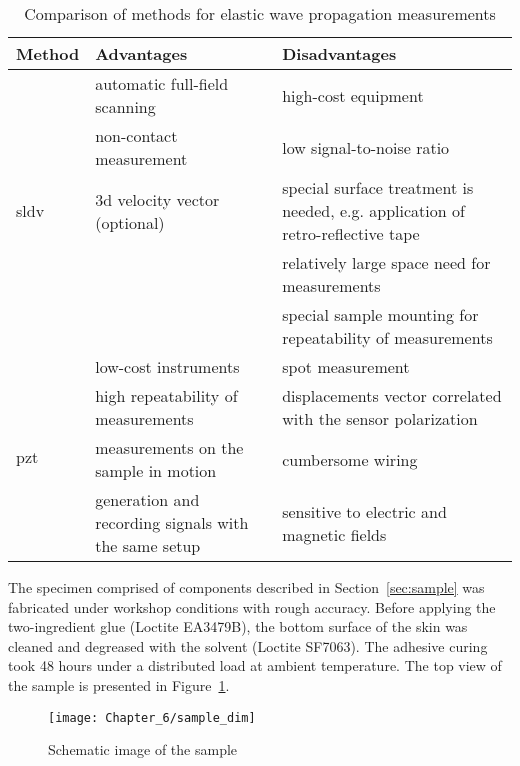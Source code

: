 \begin{table}[!htb]
	\small
	\tabcolsep=0.2cm
	\caption{\label{tab:method_comp}Comparison of methods for elastic wave propagation measurements}
	\begin{tabular}{p{}>{\raggedright}p{}>{\raggedright \arraybackslash}p{}}
		\toprule
		\textbf{Method} &\textbf{Advantages} & \textbf{Disadvantages}\\
		\midrule
		\multirow{5}{*}{\ac{sldv}}   & \tabitem automatic full-field scanning & \tabitem high-cost equipment\\ 
		& \tabitem non-contact measurement & \tabitem low signal-to-noise ratio\\
		& \tabitem \ac{3d} velocity vector (optional)& \tabitem special surface treatment is needed, e.g. application of retro-reflective tape\\
		& & \tabitem relatively large space need for measurements \\
		& & \tabitem special sample mounting for repeatability of measurements\\
		\midrule
		\multirow{5}{*}{\ac{pzt}} & \tabitem low-cost instruments & \tabitem spot measurement\\
		& \tabitem high repeatability of measurements & \tabitem displacements vector correlated with the sensor polarization\\
		& \tabitem measurements on the sample in motion & \tabitem cumbersome wiring\\
		& \tabitem generation and recording signals with the same setup & \tabitem sensitive to electric and magnetic fields\\		
		\bottomrule
	\end{tabular}
\end{table}

The specimen comprised of components described in Section~\ref{sec:sample} was fabricated under workshop conditions with rough accuracy.
Before applying the two-ingredient glue (Loctite EA3479B), the bottom surface of the skin was cleaned and degreased with the solvent (Loctite SF7063).
The adhesive curing took 48 hours under a distributed load at ambient temperature.
The top view of the sample is presented in Figure~\ref{fig:sample_dim}.
\begin{figure}[!htb]
	\begin{center}
		\texttt{[image: Chapter\_6/sample\_dim]}
	\end{center}
	\caption{Schematic image of the sample}
	\label{fig:sample_dim}
\end{figure}

